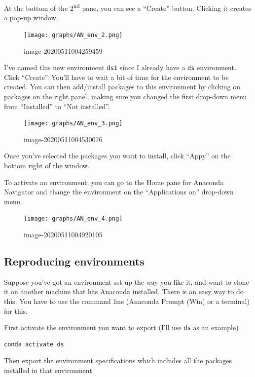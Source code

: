 \documentclass[
  letterpaper,
]{scrbook}
\begin{document}
At the bottom of the 2\textsuperscript{nd} pane, you can see a ``Create'' button. Clicking it creates a pop-up window.

\begin{figure}
\centering
\texttt{[image: graphs/AN\_env\_2.png]}
\caption{image-20200511004259459}
\end{figure}

I've named this new environment \texttt{ds1} since I already have a \texttt{ds} environment. Click ``Create''. You'll have to wait a bit of time for the environment to be created. You can then add/install packages to this environment by clicking on packages on the right panel, making sure you changed the first drop-down menu from ``Installed'' to ``Not installed''.

\begin{figure}
\centering
\texttt{[image: graphs/AN\_env\_3.png]}
\caption{image-20200511004530076}
\end{figure}

Once you've selected the packages you want to install, click ``Appy'' on the bottom right of the window.

To activate an environment, you can go to the Home pane for Anaconda Navigator and change the environment on the ``Applications on'' drop-down menu.

\begin{figure}
\centering
\texttt{[image: graphs/AN\_env\_4.png]}
\caption{image-20200511004920105}
\end{figure}

\hypertarget{reproducing-environments}{%
\subsection{Reproducing environments}\label{reproducing-environments}}

Suppose you've got an environment set up the way you like it, and want to clone it on another machine that has Anaconda installed. There is an easy way to do this. You have to use the command line (Anaconda Prompt (Win) or a terminal) for this.

First activate the environment you want to export (I'll use \texttt{ds} as an example)

\begin{verbatim}
conda activate ds
\end{verbatim}

Then export the environment specifications which includes all the packages installed in that environment
\end{document}
